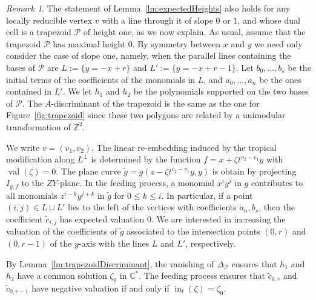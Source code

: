 \documentclass[11pt]{amsart}
\numberwithin{equation}{section}
\theoremstyle{plain}
\theoremstyle{definition}
\theoremstyle{remark}
\newtheorem{remark}[theorem]{Remark}
\begin{document}
\begin{remark}\label{rem:UnimodularTransformationsForEllipticCase}
  The statement of Lemma~\ref{lm:expectedHeights} also holds for any
  locally reducible vertex $v$ with a line through it of slope $0$ or
  $1$, and whose dual cell is a trapezoid ${\mathcal{P}}$ of height one, as we
  now explain.  As usual, assume that the trapezoid ${\mathcal{P}}$ has maximal
  height 0.  By symmetry between $x$ and $y$ we need only consider the
  case of slope one, namely, when the parallel lines containing the
  bases of ${\mathcal{P}}$ are $L:= \{y=-x+r\}$ and $L':=\{ y=-x+r-1\}$.  Let
  $b_0,\dots, b_s$ be the initial terms of the coefficients of the
  monomials in $L$, and $a_0,\ldots, a_n$ be the ones contained in
  $L'$. We let $h_1$ and $h_2$ be the polynomials supported on the two
  bases of ${\mathcal{P}}$.  The $A$-discriminant of the trapezoid is the same
  as the one for Figure~\ref{fig:trapezoid} since these two polygons
  are related by a unimodular transformation of ${\mathbb{Z}}^2$.

  We write $v=(v_1,v_2)$. The linear re-embedding induced by the
  tropical modification along $L^{\perp}$ is determined by the
  function $f=x+{\zeta} t^{v_2-v_1}y$ with $\operatorname{val}({\zeta})=0$. The plane curve
  $\tilde{g}=g(z-{\zeta} t^{v_2-v_1}y, y) $ is obtain by projecting
  $I_{g,f}$ to the $ZY$-plane. In the feeding process, a monomial
  $x^iy^j$ in $g$ contributes to all monomials $z^{i-k}y^{j+k}$ in
  $\tilde{g}$ for $0\leq k\leq i$. In particular, if a point $(i,j)\in
  L\cup L'$ lies to the left of the vertices with coefficients
  $a_n,b_s$, then the coefficient $\tilde{c}_{i,j}$ has expected
  valuation 0. We are interested in increasing the valuation of the
  coefficients of $\tilde{g}$ associated to the intersection points
  $(0,r)$ and $(0,r-1)$ of the $y$-axis with the lines $L$ and $L'$,
  respectively.

  By Lemma~\ref{lm:trapezoidDiscriminant}, the vanishing of
  $\Delta_{\mathcal{P}}$ ensures that $h_1$ and $h_2$ have a common solution
  ${\zeta}_0$ in ${\mathbb{C}}^*$. The feeding process ensures that
  $\tilde{c}_{0,r}$ and $\tilde{c}_{0,r-1}$ have negative valuation if
  and only if $\operatorname{in}_t({\zeta})={\zeta}_0$.\end{remark}
\end{document}

